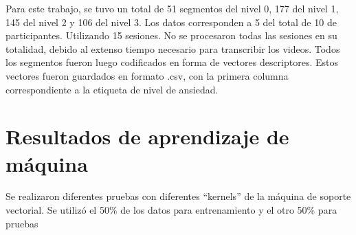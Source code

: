 Para este trabajo, se tuvo un total de 51 segmentos del nivel 0, 177 del nivel 1, 145 del nivel 2 y 106 del nivel 3. Los datos corresponden a 5 del total de 10 de participantes. Utilizando 15 sesiones. No se procesaron todas las sesiones en su totalidad, debido al extenso tiempo necesario para transcribir los videos. Todos los segmentos fueron luego codificados en forma de vectores descriptores. Estos vectores fueron guardados en formato .csv, con la primera columna correspondiente a la etiqueta de nivel de ansiedad.

\section{Resultados de aprendizaje de m\'aquina}
Se realizaron diferentes pruebas con diferentes ``kernels'' de la m\'aquina de soporte vectorial. Se utiliz\'o el 50\% de los datos para entrenamiento y el otro 50\% para pruebas


\newpage
